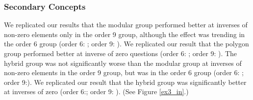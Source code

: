 \documentclass[11pt]{article}
\begin{document}
\subsubsection{Secondary Concepts}
We replicated our results that the modular group performed better at inverses of non-zero elements only in the order 9 group, although the effect was trending in the order 6 group (order 6: ; order 9: ). We replicated our result that the polygon group performed better at inverse of zero questions (order 6: ; order 9: ). The hybrid group was not significantly worse than the modular group at inverses of non-zero elements in the order 9 group, but was in the order 6 group (order 6: ; order 9:). We replicated our result that the hybrid group was significantly better at inverses of zero (order 6:; order 9: ). (See Figure \ref{ex3_in}.) \\[11pt]
\end{document}
